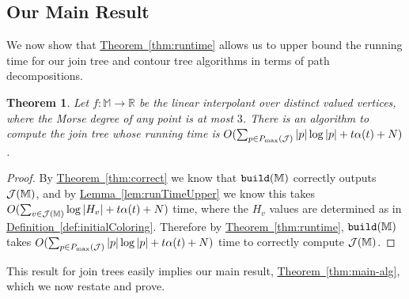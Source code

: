\documentclass[11pt]{article}
\newtheorem{theorem}{Theorem}[section]
\theoremstyle{definition}
\newcommand{\cJ}{{\cal J}}
\newcommand{\MM}{\mathbb{M}}
\newcommand{\RR}{\mathbb{R}}
\newcommand{\Thm}[1]{\hyperref[thm:#1]{Theorem~\ref*{thm:#1}}} %
\newcommand{\Lem}[1]{\hyperref[lem:#1]{Lemma~\ref*{lem:#1}}} %
\newcommand{\Def}[1]{\hyperref[def:#1]{Definition~\ref*{def:#1}}} %
\newcommand{\build}{{\tt build}}
\newcommand{\pmax}{P_{\max}}
\begin{document}
\subsection{Our Main Result}
\label{sec:implications}

We now show that \Thm{runtime} allows us to upper bound the running time for our join tree and contour 
tree algorithms in terms of path decompositions.

\begin{theorem}
Let $f:\MM \to \RR$ be the linear interpolant over distinct valued vertices, where the Morse degree of any point is at most $3$.
There is an algorithm to compute the join tree whose running time is $O(\sum_{p \in \pmax(\cJ)} |p|\log |p| + t\alpha(t) + N)$.
\end{theorem}
\begin{proof}
By \Thm{correct} we know that $\build(\MM)$ correctly outputs $\cJ(\MM)$, and by \Lem{runTimeUpper}
we know this takes $O(\sum_{v \in \cJ(\MM)} \log |H_v| + t\alpha(t) + N)$ time, where the $H_v$ values are determined as in \Def{initialColoring}.
Therefore by \Thm{runtime}, $\build(\MM)$ takes $O(\sum_{p \in \pmax(\cJ)} |p|\log |p| + t\alpha(t) + N)$ 
time to correctly compute $\cJ(\MM)$.
\end{proof}

This result for join trees easily implies our main result, \Thm{main-alg}, which we now restate and prove.
\end{document}
